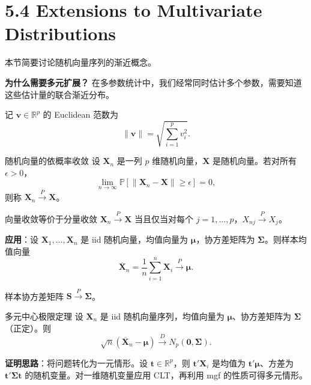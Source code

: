\section{5.4 Extensions to Multivariate Distributions}\label{sec:5.4}

本节简要讨论随机向量序列的渐近概念。

\textbf{为什么需要多元扩展？} 在多参数统计中，我们经常同时估计多个参数，需要知道这些估计量的联合渐近分布。

记 $\mathbf{v} \in \mathbb{R}^p$ 的 Euclidean 范数为
\[
\|\mathbf{v}\| = \sqrt{\sum_{i=1}^p v_i^2}.
\label{eq:euclidean-norm}
\]

\begin{definition}{随机向量的依概率收敛}\label{def:vector-convergence-probability}
设 ${\mathbf{X}_n}$ 是一列 $p$ 维随机向量，$\mathbf{X}$ 是随机向量。若对所有 $\epsilon > 0$，
\[
\lim_{n \to \infty} \mathbb{P}[\|\mathbf{X}_n - \mathbf{X}\| \geq \epsilon] = 0,
\]
则称 $\mathbf{X}_n \xrightarrow{P} \mathbf{X}$。
\end{definition}

\begin{theorem}{向量收敛等价于分量收敛}\label{th:vector-component-wise}
$\mathbf{X}_n \xrightarrow{P} \mathbf{X}$ 当且仅当对每个 $j = 1, \ldots, p$，$X_{nj} \xrightarrow{P} X_j$。
\end{theorem}

\textbf{应用}：设 $\mathbf{X}_1, \ldots, \mathbf{X}_n$ 是 iid 随机向量，均值向量为 $\boldsymbol{\mu}$，协方差矩阵为 $\boldsymbol{\Sigma}$。则样本均值向量
\[
\overline{\mathbf{X}}_n = \frac{1}{n}\sum_{i=1}^n \mathbf{X}_i \xrightarrow{P} \boldsymbol{\mu}.
\label{eq:sample-mean-vector}
\]

样本协方差矩阵 $\mathbf{S} \xrightarrow{P} \boldsymbol{\Sigma}$。

\begin{example}{多元中心极限定理}\label{th:multivariate-clt}
设 ${\mathbf{X}_n}$ 是 iid 随机向量序列，均值向量为 $\boldsymbol{\mu}$、协方差矩阵为 $\boldsymbol{\Sigma}$（正定）。则
\[
\sqrt{n}(\overline{\mathbf{X}}_n - \boldsymbol{\mu}) \xrightarrow{D} N_p(\mathbf{0}, \boldsymbol{\Sigma}).
\label{eq:multivariate-clt}
\]
\end{example}

\textbf{证明思路}：将问题转化为一元情形。设 $\mathbf{t} \in \mathbb{R}^p$，则 $\mathbf{t}'\mathbf{X}_i$ 是均值为 $\mathbf{t}'\boldsymbol{\mu}$、方差为 $\mathbf{t}'\boldsymbol{\Sigma}\mathbf{t}$ 的随机变量。对一维随机变量应用 CLT，再利用 mgf 的性质可得多元情形。%

